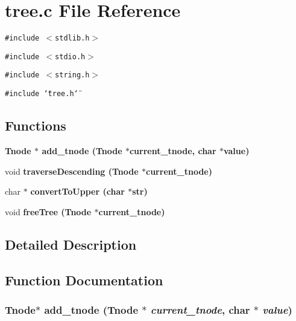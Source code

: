 \section{tree.c File Reference}
\label{tree_8c}
{\tt \#include $<$stdlib.h$>$}\par
{\tt \#include $<$stdio.h$>$}\par
{\tt \#include $<$string.h$>$}\par
{\tt \#include \char`\"{}tree.h\char`\"{}}\par
\subsection*{Functions}
\begin{CompactItemize}
\item 
\bf{Tnode} $\ast$ \bf{add\_\-tnode} (\bf{Tnode} $\ast$current\_\-tnode, char $\ast$value)
\item 
void \bf{traverse\-Descending} (\bf{Tnode} $\ast$current\_\-tnode)
\item 
char $\ast$ \bf{convert\-To\-Upper} (char $\ast$str)
\item 
void \bf{free\-Tree} (\bf{Tnode} $\ast$current\_\-tnode)
\end{CompactItemize}


\subsection{Detailed Description}


\subsection{Function Documentation}
\subsubsection{\setlength{\rightskip}{0pt plus 5cm}\bf{Tnode}$\ast$ add\_\-tnode (\bf{Tnode} $\ast$ {\em current\_\-tnode}, char $\ast$ {\em value})}\label{tree_8c_4bfce116a958985cbce7618d701f8197}



